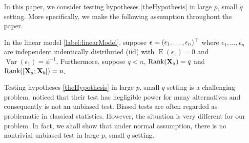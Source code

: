 \documentclass[smallextended]{svjour3}       %
\DeclareMathOperator{\myRank}{Rank}
\DeclareMathOperator{\myE}{E}
\DeclareMathOperator{\myVar}{Var}
\begin{document}
In this paper, we consider testing hypotheses \eqref{theHypothesis} in large $p$, small $q$ setting.
More specifically, we make the following assumption throughout the paper.
\begin{assumption}
    In the linear model \eqref{label:linearModel}, 
    suppose $\boldsymbol{\epsilon}=(\epsilon_1,\ldots,\epsilon_n)^\top$ where $\epsilon_1,\ldots, \epsilon_n$ are independent indentically distributed (iid) with $\myE (\epsilon_1) = 0$ and $\myVar (\epsilon_1) = \phi^{-1}$.
    Furthermore, suppose $q<n$, $\myRank(\BX_a)=q$ and $\myRank([\BX_a; \BX_b])=n$.
    \label{Assumption}
\end{assumption}
Testing hypotheses \eqref{theHypothesis} in large $p$, small $q$ setting is a challenging problem.
\cite{Goeman2006} noticed that their test has negligible power for many alternatives and consequently is not an unbiased test.
Biased tests are often regarded as problematic in classical statistics.
However, the situation is very different for our problem.
In fact, we shall show that under normal assumption, there is no nontrivial unbiased test in large $p$, small $q$ setting.
\end{document}
